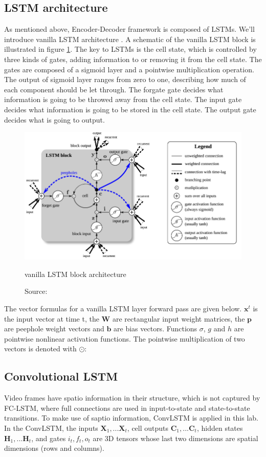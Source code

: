 \documentclass[twoside,a4paper,article]{combine}
\begin{document}
\subsection{LSTM architecture}
As mentioned above, Encoder-Decoder framework is composed of LSTMs. We'll introduce vanilla LSTM architecture \cite{odyssey}. A schematic
of the vanilla LSTM block is illustrated in figure \ref{fig:vanilla}. The key to LSTMs is the cell state, which is controlled by three
kinds of gates, adding information to or removing it from the cell state. The gates are composed of a sigmoid layer and a pointwise
multiplication operation. The output of sigmoid layer ranges from zero to one, describing how much of each component should be let through.
The forgate gate decides what information is going to be throwed away from the cell state. The input gate decides what information is going
to be stored in the cell state. The output gate decides what is going to output.
\begin{figure}
    \includegraphics[width=\linewidth]{vanilla}
    \caption{vanilla LSTM block architecture}
    \caption*{Source: \protect\cite{odyssey}}
    \label{fig:vanilla}
\end{figure}

The vector formulas for a vanilla LSTM layer forward pass are given below. $\bm{x}^t$ is the input vector at time t, the $\bm{W}$ are 
rectangular input weight matrices, the $\bm{p}$ are peephole weight vectors and $\bm{b}$ are bias vectors. Functions $\sigma$, $g$ and 
$h$ are pointwise nonlinear activation functions. The pointwise multiplication of two vectors is denoted with $\odot$:

\subsection{Convolutional LSTM}
Video frames have spatio information in their structure, which is not captured by FC-LSTM, where full connections are used in
input-to-state and state-to-state transitions. To make use of saptio information, ConvLSTM is applied in this lab. In the ConvLSTM, the
inputs $\bm{X}_1,...\bm{X}_t$, cell outputs $\bm{C}_1,...\bm{C}_t$, hidden states $\bm{H}_1,...\bm{H}_t$, and gates $i_t,f_t,o_t$ are 3D
tensors whose last two dimensions are spatial dimensions (rows and columns). 
\end{document}
